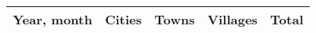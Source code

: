 \begin{tabular}{lrrrr}
\toprule
Year, month   & Cities  & Towns & Villages  & Total \\
\midrule

\bottomrule
\end{tabular}
%
%
%     
